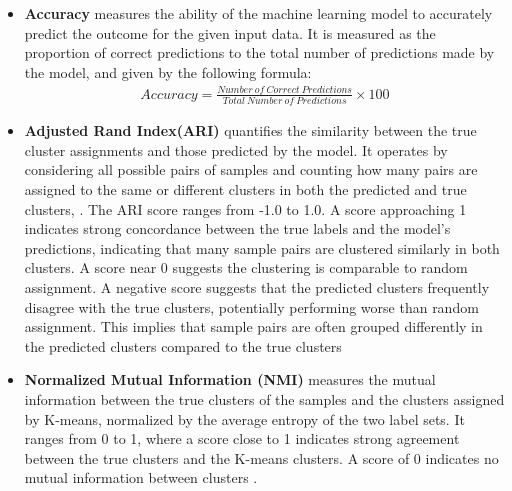 \documentclass[gmd, manuscript]{copernicus}
\begin{document}
\begin{itemize}
\item  \textbf{Accuracy} measures the ability of the machine learning model to accurately predict the outcome for the given input data. It is measured as the proportion of correct predictions to the total number of predictions made by the model, and given by the following formula:
\begin{align*}
    Accuracy = \frac{Number~ of ~Correct~Predictions}{Total~ Number~ of~ Predictions
}\times 100
\end{align*}
 \item  \textbf{Adjusted Rand Index(ARI)}  quantifies the similarity between the true cluster assignments and those predicted by the model. It operates by considering all possible pairs of samples and counting how many pairs are assigned to the same or different clusters in both the predicted and true clusters, \cite{chacon2023minimum, chekir20173d}. The ARI score ranges from -1.0 to 1.0. A score approaching 1 indicates strong concordance between the true labels and the model's predictions, indicating that many sample pairs are clustered similarly in both clusters. A score near 0 suggests the clustering is comparable to random assignment. A negative score suggests that the predicted clusters frequently disagree with the true clusters, potentially performing worse than random assignment. This implies that sample pairs are often grouped differently in the predicted clusters compared to the true clusters
\item \textbf{Normalized Mutual Information (NMI)} measures the mutual information between the true clusters of the samples and the clusters assigned by K-means, normalized by the average entropy of the two label sets. It ranges from 0 to 1, where a score close to 1 indicates strong agreement between the true clusters and the K-means clusters. A score of 0 indicates no mutual information between clusters \citep{kvaalseth2017normalized}.
\end{itemize}
\end{document}
